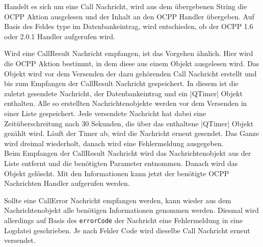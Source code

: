 \noindent Handelt es sich um eine Call Nachricht, wird aus dem übergebenen String die OCPP Aktion ausgelesen und der Inhalt an den OCPP Handler übergeben. Auf Basis des Feldes \glqq{}type\grqq{} im Datenbankeintrag, wird entschieden, ob der OCPP 1.6 oder 2.0.1 Handler aufgerufen wird.\newline

\noindent Wird eine CallResult Nachricht empfangen, ist das Vorgehen ähnlich. Hier wird die OCPP Aktion bestimmt, in dem diese aus einem Objekt ausgelesen wird. Das Objekt wird vor dem Versenden der dazu gehörenden Call Nachricht erstellt und bis zum Empfangen der CallResult Nachricht gespeichert. In diesem ist die zuletzt gesendete Nachricht, der Datenbankeintrag und ein \spverb|QTimer| Objekt enthalten. Alle so erstellten Nachrichtenobjekte werden vor dem Versenden in einer Liste gespeichert. Jede versendete Nachricht hat dabei eine Zeitüberschreitung nach 30 Sekunden, die über das enthaltene \spverb|QTimer| Objekt gezählt wird. Läuft der Timer ab, wird die Nachricht erneut gesendet. Das Ganze wird dreimal wiederholt, danach wird eine Fehlermeldung ausgegeben.\\
\noindent Beim Empfangen der CallResult Nachricht wird das Nachrichtenobjekt aus der Liste entfernt und die benötigten Parameter entnommen. Danach wird das Objekt gelöscht. Mit den Informationen kann jetzt der benötigte OCPP Nachrichten Handler aufgerufen werden. \newline

\noindent Sollte eine CallError Nachricht empfangen werden, kann wieder aus dem Nachrichtenobjekt alle benötigen Informationen genommen werden. Diesmal wird allerdings auf Basis des \verb|errorCode| der Nachricht eine Fehlermeldung in eine Logdatei geschrieben. Je nach Fehler Code wird dieselbe Call Nachricht erneut versendet.\\

